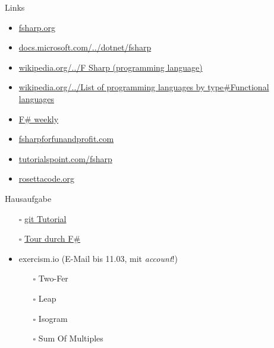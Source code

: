 \documentclass[t]{beamer}
\begin{document}
\begin{frame}[label={sec:org75bbfd5}]{Links}
\begin{itemize}
\item \href{https://fsharp.org/}{fsharp.org}
\item \href{https://docs.microsoft.com/de-de/dotnet/fsharp/}{docs.microsoft.com/../dotnet/fsharp}
\item \href{https://en.wikipedia.org/wiki/F\_Sharp\_(programming\_language)}{wikipedia.org/../F Sharp (programming language)}
\item \href{https://en.wikipedia.org/wiki/List\_of\_programming\_languages\_by\_type\#Functional\_languages}{wikipedia.org/../List of programming languages by type\#Functional languages}
\item \href{https://sergeytihon.com/}{F\# weekly}
\item \href{https://fsharpforfunandprofit.com/}{fsharpforfunandprofit.com}
\item \href{https://www.tutorialspoint.com/fsharp/index.htm}{tutorialspoint.com/fsharp}
\item \href{http://www.rosettacode.org/}{rosettacode.org}
\end{itemize}
\end{frame}

\begin{frame}[label={sec:org9222f66}]{Hausaufgabe}
\begin{itemize}
\item[{$\square$}] \href{https://git-scm.com/docs/gittutorial}{git Tutorial}
\item[{$\square$}] \href{https://docs.microsoft.com/de-de/dotnet/fsharp/tour}{Tour durch F\#}
\item exercism.io (E-Mail bis 11.03, mit \emph{account}!)
\begin{itemize}
\item[{$\square$}] Two-Fer
\item[{$\square$}] Leap
\item[{$\square$}] Isogram
\item[{$\square$}] Sum Of Multiples
\end{itemize}
\end{itemize}
\end{frame}
\end{document}
